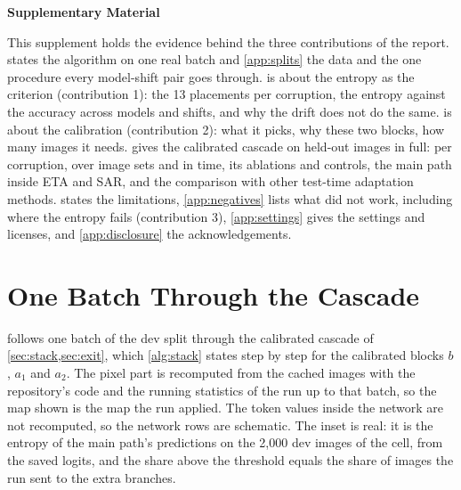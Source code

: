 \documentclass{article}
\begin{document}



\clearpage
\appendix
\onecolumn
\renewcommand{\topfraction}{0.95}\renewcommand{\bottomfraction}{0.9}\renewcommand{\textfraction}{0.05}\renewcommand{\floatpagefraction}{0.85}
\setlength{\textfloatsep}{10pt plus 2pt minus 4pt}\setlength{\floatsep}{8pt plus 2pt minus 2pt}\setlength{\intextsep}{8pt plus 2pt minus 2pt}
\makeatletter\setlength{\@fptop}{0pt}\setlength{\@fpsep}{8pt plus 2pt}\makeatother  %
\renewcommand{\thesection}{\Alph{section}}
\renewcommand{\thetable}{S\arabic{table}}
\renewcommand{\thefigure}{S\arabic{figure}}
\renewcommand{\thealgorithm}{S\arabic{algorithm}}
\setcounter{table}{0}
\setcounter{figure}{0}

\begin{center}{\Large\bfseries Supplementary Material}\end{center}

This supplement holds the evidence behind the three contributions of the report.  states the algorithm on one real batch and \cref{app:splits} the data and the one procedure every model-shift pair goes through.  is about the entropy as the criterion (contribution 1): the 13 placements per corruption, the entropy against the accuracy across models and shifts, and why the drift does not do the same.  is about the calibration (contribution 2): what it picks, why these two blocks, how many images it needs.  gives the calibrated cascade on held-out images in full: per corruption, over image sets and in time, its ablations and controls, the main path inside ETA and SAR, and the comparison with other test-time adaptation methods.  states the limitations, \cref{app:negatives} lists what did not work, including where the entropy fails (contribution 3), \cref{app:settings} gives the settings and licenses, and \cref{app:disclosure} the acknowledgements.

\section{One Batch Through the Cascade}
\label{app:overview}
 follows one batch of the dev split through the calibrated cascade of \cref{sec:stack,sec:exit}, which \cref{alg:stack} states step by step for the calibrated blocks $b$, $a_1$ and $a_2$. The pixel part is recomputed from the cached images with the repository's code and the running statistics of the run up to that batch, so the map shown is the map the run applied. The token values inside the network are not recomputed, so the network rows are schematic. The inset is real: it is the entropy of the main path's predictions on the 2{,}000 dev images of the cell, from the saved logits, and the share above the threshold equals the share of images the run sent to the extra branches.
\end{document}
